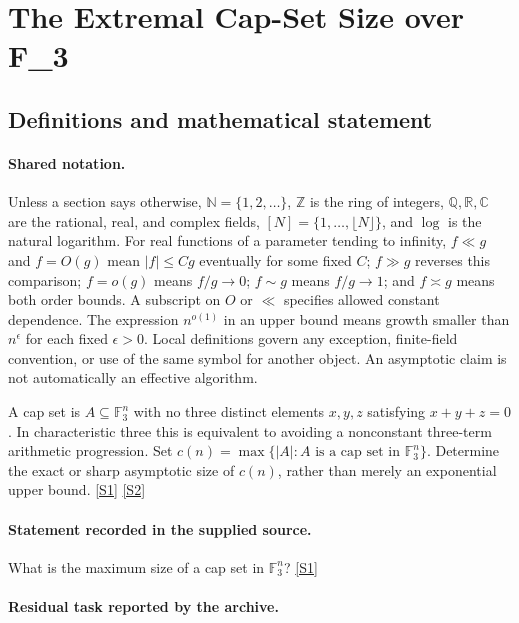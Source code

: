 \documentclass[11pt,a4paper]{article}
\newcommand{\N}{\mathbb{N}}
\newcommand{\Z}{\mathbb{Z}}
\newcommand{\Q}{\mathbb{Q}}
\newcommand{\R}{\mathbb{R}}
\newcommand{\C}{\mathbb{C}}
\newcommand{\F}{\mathbb{F}}
\newcommand{\sref}[2]{\hyperlink{source:#1:#2}{[S#2]}}
\begin{document}
\section{The Extremal Cap-Set Size over F\_3}\label{statement}


\subsection{Definitions and mathematical statement}

\paragraph{Shared notation.}Unless a section says otherwise, $\N=\{1,2,\ldots\}$,
$\Z$ is the ring of integers, $\Q,\R,\C$ are the rational, real, and complex
fields, $[N]=\{1,\ldots,\lfloor N\rfloor\}$, and $\log$ is the natural
logarithm. For real functions of a parameter tending to infinity,
$f\ll g$ and $f=O(g)$ mean $|f|\leq Cg$ eventually for some fixed $C$;
$f\gg g$ reverses this comparison; $f=o(g)$ means $f/g\to0$;
$f\sim g$ means $f/g\to1$; and $f\asymp g$ means both order bounds.
A subscript on $O$ or $\ll$ specifies allowed constant dependence.
The expression $n^{o(1)}$ in an upper bound means growth smaller than
$n^\epsilon$ for each fixed $\epsilon>0$. Local definitions govern any
exception, finite-field convention, or use of the same symbol for another
object. An asymptotic claim is not automatically an effective algorithm.



A cap set is $A\subseteq\F_3^n$ with no three distinct elements $x,y,z$ satisfying $x+y+z=0$. In characteristic three this is equivalent to avoiding a nonconstant three-term arithmetic progression. Set $c(n)=\max\{|A|:A\text{ is a cap set in }\F_3^n\}$. Determine the exact or sharp asymptotic size of $c(n)$, rather than merely an exponential upper bound. \sref{statement}{1} \sref{statement}{2}

\paragraph{Statement recorded in the supplied source.}
What is the maximum size of a cap set in $\mathbb{F}_3^n$? \sref{statement}{1}

\paragraph{Residual task reported by the archive.}
\end{document}
